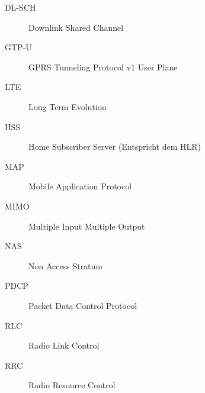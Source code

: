 \begin{description}
	\item[DL-SCH] Downlink Shared Channel
	\item[GTP-U] GPRS Tunneling Protocol v1 User Plane
	\item[LTE] Long Term Evolution
	\item[HSS] Home Subscriber Server (Entspricht dem HLR)
	\item[MAP] Mobile Application Protocol
	\item[MIMO] Multiple Input Multiple Output
	\item[NAS] Non Access Stratum
	\item[PDCP] Packet Data Control Protocol
	\item[RLC] Radio Link Control
	\item[RRC] Radio Resource Control
\end{description}
